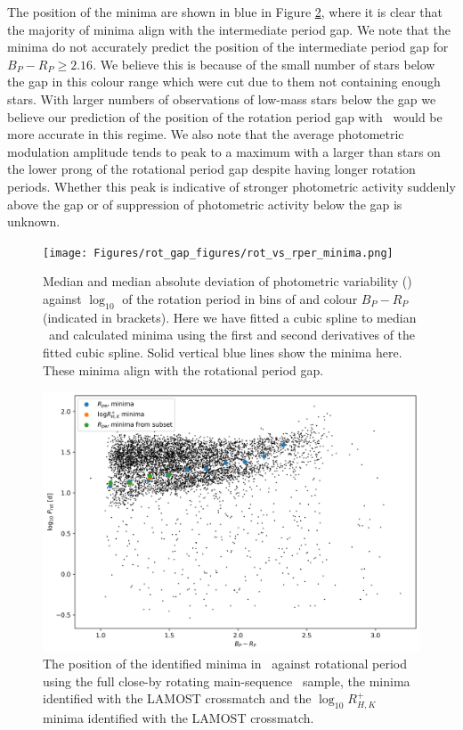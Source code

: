 The position of the minima are shown in blue in Figure \ref{fig:indicating_minima}, where it is clear that the majority of minima align with the intermediate period gap.
We note that the minima do not accurately predict the position of the intermediate period gap for $B_P-R_P \geq 2.16$.
We believe this is because of the small number of stars below the gap in this colour range which were cut due to them not containing enough stars.
 With larger numbers of observations of low-mass stars below the gap we believe our prediction of the position of the rotation period gap with \rper{} \ would be more accurate in this regime. 
We also note that the average photometric modulation amplitude tends to peak to a maximum with a larger \rper{} than stars on the lower prong of the rotational period gap despite having longer rotation periods.
Whether this peak is indicative of stronger photometric activity suddenly above the gap or of suppression of photometric activity below the gap is unknown.

\begin{figure}
\centering
  \texttt{[image: Figures/rot\_gap\_figures/rot\_vs\_rper\_minima.png]}
  \caption{
  Median and median absolute deviation of photometric variability (\rper{}) against $\log_{10}$ of the rotation period in bins of and colour \gaia{} $B_P-R_P$ (indicated in brackets). Here we have fitted a cubic spline to median \rper{} \ and calculated minima using the first and second derivatives of the fitted cubic spline. Solid vertical blue lines show the minima here. These minima align with the rotational period gap.}
  \label{fig:binned_rper_scatter}
\end{figure}

\begin{figure}
\centering
  \includegraphics[width=\textwidth]{Figures/rot_gap_figures/rot_dist_minima_shown.png}
  \caption{
  The position of the identified minima in \rper{} \ against rotational period using the full close-by rotating main-sequence \kepler{} \ sample, the \rper{} minima identified with the \kepler{} LAMOST crossmatch and the $\log_{10} R^{+}_{H,K}$ minima identified with the \kepler{} LAMOST crossmatch.}
  \label{fig:indicating_minima}
\end{figure}

